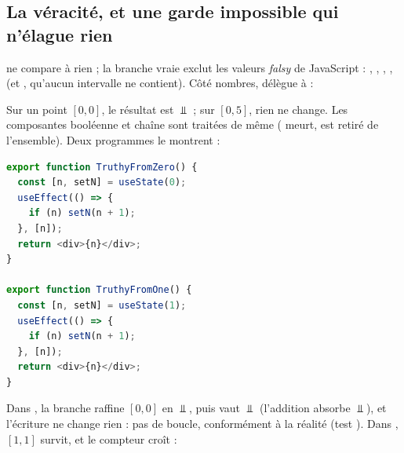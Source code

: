 \subsection{La véracité, et une garde impossible qui n'élague rien}

 ne compare à rien ; la branche vraie exclut les valeurs
\emph{falsy} de JavaScript : , , ,
,  (et , qu'aucun intervalle ne contient).
Côté nombres,  délègue à  :


Sur un point $[0,0]$, le résultat est $\Bot$ ; sur $[0,5]$, rien ne change.
Les composantes booléenne et chaîne sont traitées de même (
meurt,  est retiré de l'ensemble). Deux programmes le montrent :

\begin{lstlisting}[language=TypeScript,caption={Garde de véracité (\file{/tmp/ch09/limits.tsx}, extrait)},label={lst:treillis-simples-truthy-ex}]
export function TruthyFromZero() {
  const [n, setN] = useState(0);
  useEffect(() => {
    if (n) setN(n + 1);
  }, [n]);
  return <div>{n}</div>;
}

export function TruthyFromOne() {
  const [n, setN] = useState(1);
  useEffect(() => {
    if (n) setN(n + 1);
  }, [n]);
  return <div>{n}</div>;
}
\end{lstlisting}

Dans , la branche raffine $[0,0]$ en $\Bot$, puis
 vaut $\Bot$ (l'addition absorbe $\Bot$), et l'écriture ne change
rien : pas de boucle, conformément à la réalité (test
). Dans
, $[1,1]$ survit, et le compteur croît :


